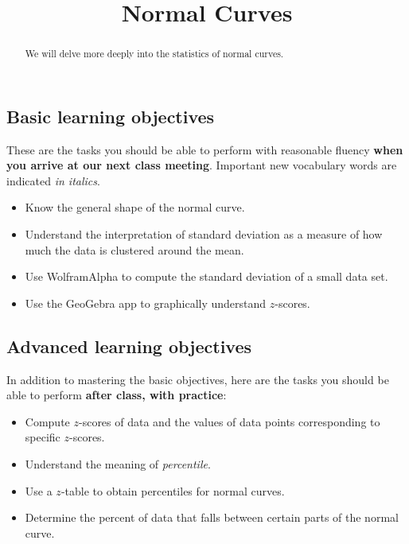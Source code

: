 \documentclass{ximera}
\title{Normal Curves}
\begin{document}
\begin{abstract}
We will delve more deeply into the statistics of normal curves.
\end{abstract}
\maketitle

\subsection*{Basic learning objectives}

These are the tasks you should be able to perform with reasonable fluency \textbf{when you arrive at our next class meeting}. Important new vocabulary words are indicated \emph{in italics}. 

\begin{itemize}
    \item Know the general shape of the normal curve.
    \item Understand the interpretation of standard deviation as a measure of how much the data is clustered around the mean.
    \item Use WolframAlpha to compute the standard deviation of a small data set.
    \item Use the GeoGebra app to graphically understand $z$-scores.
\end{itemize}

\subsection*{Advanced learning objectives}

In addition to mastering the basic objectives, here are the tasks you should be able to perform \textbf{after class, with practice}: 

\begin{itemize}
	\item Compute $z$-scores of data and the values of data points corresponding to specific $z$-scores.
    \item Understand the meaning of \emph{percentile}.
	\item Use a $z$-table to obtain percentiles for normal curves.
    \item Determine the percent of data that falls between certain parts of the normal curve.
\end{itemize}
\end{document}
